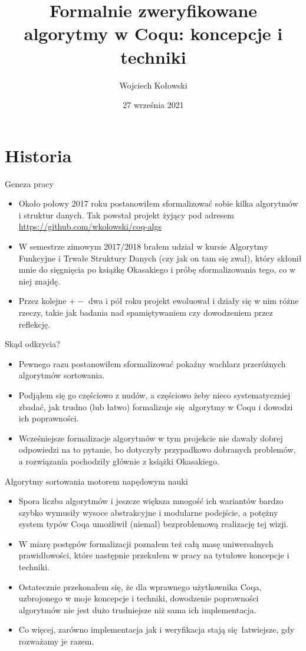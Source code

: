 \documentclass{beamer}
\title{Formalnie zweryfikowane algorytmy w Coqu: koncepcje i techniki}
\author{Wojciech Kołowski}
\date{27 września 2021}
\begin{document}
\frame{\titlepage}

\frame{\tableofcontents}

\section{Historia}

\begin{frame}{Geneza pracy}
\begin{itemize}
	\item Około połowy 2017 roku postanowiłem sformalizować sobie kilka algorytmów i struktur danych. Tak powstał projekt żyjący pod adresem \url{https://github.com/wkolowski/coq-algs}
	\item W semestrze zimowym 2017/2018 brałem udział w kursie Algorytmy Funkcyjne i Trwałe Struktury Danych (czy jak on tam się zwał), który skłonił mnie do sięgnięcia po książkę Okasakiego i próbę sformalizowania tego, co w niej znajdę.
	\item Przez kolejne $+-$ dwa i pół roku projekt ewoluował i działy się w nim różne rzeczy, takie jak badania nad spamiętywaniem czy dowodzeniem przez reflekcję.
\end{itemize}
\end{frame}

\begin{frame}{Skąd odkrycia?}
\begin{itemize}
	\item Pewnego razu postanowiłem sformalizować pokaźny wachlarz przeróżnych algorytmów sortowania.
	\item Podjąłem się go częściowo z nudów, a częściowo żeby nieco systematyczniej zbadać, jak trudno (lub łatwo) formalizuje się algorytmy w Coqu i dowodzi ich poprawności.
	\item Wcześniejsze formalizacje algorytmów w tym projekcie nie dawały dobrej odpowiedzi na to pytanie, bo dotyczyły przypadkowo dobranych problemów, a rozwiązania pochodziły głównie z książki Okasakiego.
\end{itemize}
\end{frame}

\begin{frame}{Algorytmy sortowania motorem napędowym nauki}
\begin{itemize}
	\item Spora liczba algorytmów i jeszcze większa mnogość ich wariantów bardzo szybko wymusiły wysoce abstrakcyjne i modularne podejście, a potężny system typów Coqa umożliwił (niemal) bezproblemową realizację tej wizji.
	\item W miarę postępów formalizacji poznałem też całą masę uniwersalnych prawidłowości, które następnie przekułem w pracy na tytułowe koncepcje i techniki.
	\item Ostatecznie przekonałem się, że dla wprawnego użytkownika Coqa, uzbrojonego w moje koncepcje i techniki, dowodzenie poprawności algorytmów nie jest dużo trudniejsze niż sama ich implementacja.
	\item Co więcej, zarówno implementacja jak i weryfikacja stają się łatwiejsze, gdy rozważamy je razem.
\end{itemize}
\end{frame}
\end{document}
